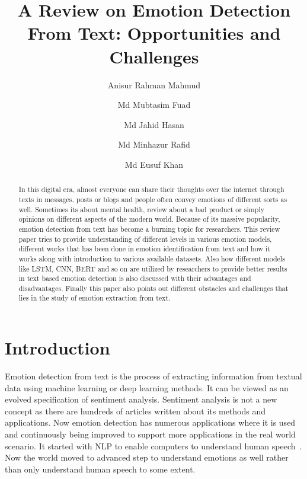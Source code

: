 \documentclass[runningheads]{llncs}
\begin{document}
%
\title{A Review on Emotion Detection From Text: Opportunities and Challenges}
%
%
\author{Anisur Rahman Mahmud \and
Md Mubtasim Fuad \and
Md Jahid Hasan \and Md Minhazur Rafid  \and Md Eusuf Khan  }
%
%
%
\maketitle              %
%
\begin{abstract}
In this digital era, almost everyone can share their thoughts over the internet through texts in messages, posts or blogs and people often convey emotions of different sorts as well. Sometimes its about mental health, review about a bad product or simply opinions on different aspects of the modern world. Because of its massive popularity, emotion detection from text has become a burning topic for researchers. This review paper tries to provide understanding of different levels in various emotion models, different works that has been done in emotion identification from text and how it works along with introduction to various available datasets. Also how different models like LSTM, CNN, BERT and so on are utilized by researchers to provide better results in text based emotion detection is also discussed with their advantages and disadvantages. Finally this paper also points out different obstacles and challenges that lies in the study of emotion extraction from text. 

\end{abstract}
%
%
%
\section{Introduction}
Emotion detection from text is the process of extracting information from textual data using machine learning or deep learning methods. It can be viewed as an evolved specification of sentiment analysis. Sentiment analysis is not a new concept as there are hundreds of articles written about its methods and applications. Now emotion detection has numerous applications where it is used and continuously being improved to support more applications in the real world scenario. It started with NLP to enable computers to understand human speech~\cite{ref_url1}. Now the world moved to advanced step to understand emotions as well rather than only understand human speech to some extent.
\end{document}
